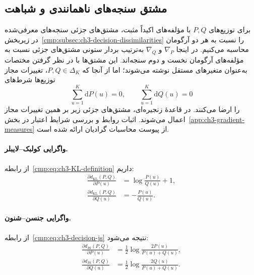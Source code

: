\subsection{مشتق سنجه‌های ناهمانندی و شباهت}
\label{cmp:subsec:ch3-gradient-measures}

برای توزیع‌های $P,Q$ با مؤلفه‌های اکیداً مثبت،
مشتق‌های جزئی سنجه‌های معرفی‌شده در
زیربخش~\ref{cmp:subsec:ch3-decision-dissimilarities}
را نسبت به هر دو آرگومان محاسبه می‌کنیم.
در اینجا $\nabla_P$ و $\nabla_Q$ به‌ترتیب
بردار ستونی مشتق‌های جزئی نسبت به مؤلفه‌های
آرگومان نخست و دوم سنجه‌اند.
این مشتق‌ها با در نظر گرفتن مختصات به‌عنوان
متغیرهای مستقل نوشته می‌شوند؛ اما از آنجا که
$P,Q\in\Delta_K$، تغییرات مجاز توزیع‌ها
شرط‌های
\[
\sum_{u=1}^{K}\mathrm dP(u)=0,\qquad
\sum_{u=1}^{K}\mathrm dQ(u)=0
\]
را ارضا می‌کنند. در قاعدهٔ زنجیره‌ای، مشتق‌های
جزئی زیر بر همین تغییرات مجاز اعمال می‌شوند.
اثبات روابط و بررسی شرایط اعتبار در
بخش~\ref{app:ch3-gradient-measures} از پیوست
محاسبات گرادیان ارائه شده است.

\paragraph{واگرایی کولبک--لایبلر.}
از رابطه~\eqref{cmp:eq:ch3-KL-definition} داریم:
\begin{equation}\label{cmp:eq:ch3-gradient-kl-partials}
\boxed{\begin{aligned}
\frac{\partial d_{\mathrm{KL}}(P,Q)}{\partial P(u)}
&=\log\frac{P(u)}{Q(u)}+1,\\
\frac{\partial d_{\mathrm{KL}}(P,Q)}{\partial Q(u)}
&=-\frac{P(u)}{Q(u)}.
\end{aligned}}
\end{equation}

\paragraph{واگرایی جنسن--شنون.}
از رابطه~\eqref{cmp:eq:ch3-decision-js} نتیجه می‌شود:
\begin{equation}\label{cmp:eq:ch3-gradient-js-partials}
\boxed{\begin{aligned}
\frac{\partial d_{\mathrm{JS}}(P,Q)}{\partial P(u)}
&=\frac12\log\frac{2P(u)}{P(u)+Q(u)},\\
\frac{\partial d_{\mathrm{JS}}(P,Q)}{\partial Q(u)}
&=\frac12\log\frac{2Q(u)}{P(u)+Q(u)}.
\end{aligned}}
\end{equation}

